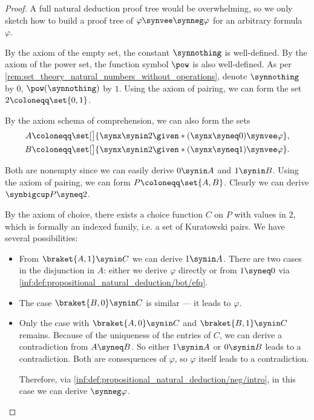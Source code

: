 \begin{proof}
  A full natural deduction proof tree would be overwhelming, so we only sketch how to build a proof tree of \( \varphi \synvee \synneg \varphi \) for an arbitrary formula \( \varphi \).

  By the axiom of the empty set, the constant \( \synnothing \) is well-defined. By the axiom of the power set, the function symbol \( \pow \) is also well-defined. As per \cref{rem:set_theory_natural_numbers_without_operations}, denote \( \synnothing \) by \( 0 \), \( \pow(\synnothing) \) by \( 1 \). Using the axiom of pairing, we can form the set \( 2 \coloneqq \set{ 0, 1 } \).

  By the axiom schema of comprehension, we can also form the sets
  \begin{align*}
    A &\coloneqq \set[\big]{ \synx \synin 2 \given* (\synx \syneq 0) \synvee \varphi }, \\
    B &\coloneqq \set[\big]{ \synx \synin 2 \given* (\synx \syneq 1) \synvee \varphi }.
  \end{align*}

  Both are nonempty since we can easily derive \( 0 \synin A \) and \( 1 \synin B \). Using the axiom of pairing, we can form \( P \coloneqq \set{ A, B } \). Clearly we can derive \( \synbigcup P \syneq 2 \).

  By the axiom of choice, there exists a choice function \( C \) on \( P \) with values in \( 2 \), which is formally an indexed family, i.e. a set of Kuratowski pairs. We have several possibilities:

  \begin{itemize}
    \item From \( \braket{ A, 1 } \synin C \) we can derive \( 1 \synin A \). There are two cases in the disjunction in \( A \): either we derive \( \varphi \) directly or from \( 1 \syneq 0 \) via \ref{inf:def:propositional_natural_deduction/bot/efq}.

    \item The case \( \braket{ B, 0 } \synin C \) is similar --- it leads to \( \varphi \).

    \item Only the case with \( \braket{ A, 0 } \synin C \) and \( \braket{ B, 1 } \synin C \) remains. Because of the uniqueness of the entries of \( C \), we can derive a contradiction from \( A \syneq B \). So either \( 1 \synin A \) or \( 0 \synin B \) leads to a contradiction. Both are consequences of \( \varphi \), so \( \varphi \) itself leads to a contradiction.

    Therefore, via \ref{inf:def:propositional_natural_deduction/neg/intro}, in this case we can derive \( \synneg \varphi \).
  \end{itemize}
\end{proof}

